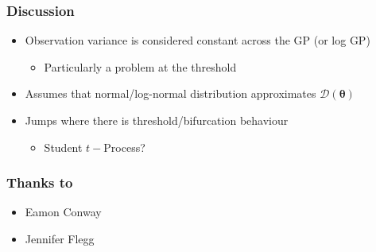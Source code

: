 \documentclass{beamer}
\begin{document}
\begin{frame}
\end{frame}

\begin{frame}
    \frametitle{Discussion}
    \begin{itemize}
        \item Observation variance is considered constant across the GP (or log GP)\begin{itemize}
                  \item Particularly a problem at the threshold
              \end{itemize}
        \item Assumes that normal/log-normal distribution approximates $\mathcal{D}(\bm{\theta})$
        \item Jumps where there is threshold/bifurcation behaviour\begin{itemize}
                  \item Student $t-$Process?
              \end{itemize}
    \end{itemize}
\end{frame}

\begin{frame}
    \frametitle{Thanks to}
    \begin{itemize}
        \item Eamon Conway
        \item Jennifer Flegg
    \end{itemize}
\end{frame}
\end{document}
